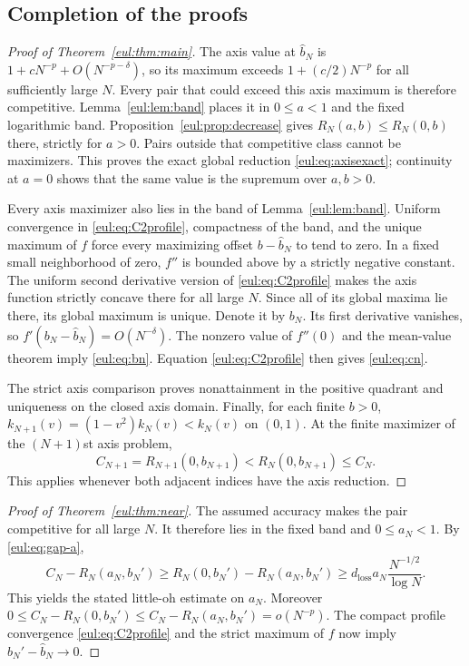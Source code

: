\subsection{Completion of the proofs}
\begin{proof}[Proof of Theorem~\ref{eul:thm:main}]
The axis value at $\widehat b_N$ is
$1+cN^{-p}+O(N^{-p-\delta})$, so its maximum exceeds
$1+(c/2)N^{-p}$ for all sufficiently large $N$.
Every pair that could exceed this axis maximum is therefore competitive.
Lemma~\ref{eul:lem:band} places it in $0\leq a<1$ and the fixed
logarithmic band.  Proposition~\ref{eul:prop:decrease} gives
$R_N(a,b)\leq R_N(0,b)$ there, strictly for $a>0$.
Pairs outside that competitive class cannot be maximizers.  This proves
the exact global reduction \eqref{eul:eq:axisexact}; continuity at $a=0$
shows that the same value is the supremum over $a,b>0$.

Every axis maximizer also lies in the band of Lemma~\ref{eul:lem:band}.
Uniform convergence in \eqref{eul:eq:C2profile}, compactness of the band,
and the unique maximum of $f$ force every maximizing offset
$b-\widehat b_N$ to tend to zero.  In a fixed small neighborhood of
zero, $f''$ is bounded above by a strictly negative constant.  The
uniform second derivative version of \eqref{eul:eq:C2profile} makes the
axis function strictly concave there for all large $N$.
Since all of its global maxima lie there, its global maximum is unique.
Denote it by $b_N$.
Its first derivative vanishes, so
$f'(b_N-\widehat b_N)=O(N^{-\delta})$.
The nonzero value of $f''(0)$ and the mean-value theorem imply
\eqref{eul:eq:bn}.  Equation \eqref{eul:eq:C2profile} then gives
\eqref{eul:eq:cn}.

The strict axis comparison proves nonattainment in the positive quadrant
and uniqueness on the closed axis domain.  Finally, for each finite
$b>0$, $k_{N+1}(v)=(1-v^2)k_N(v)<k_N(v)$ on $(0,1)$.
At the finite maximizer of the $(N+1)$st axis problem,
\[
 C_{N+1}=R_{N+1}(0,b_{N+1})
  <R_N(0,b_{N+1})\leq C_N.
\]
This applies whenever both adjacent indices have the axis reduction.
\end{proof}

\begin{proof}[Proof of Theorem~\ref{eul:thm:near}]
The assumed accuracy makes the pair competitive for all large $N$.
It therefore lies in the fixed band and $0\leq a_N<1$.
By \eqref{eul:eq:gap-a},
\[
 C_N-R_N(a_N,b_N')
 \geq R_N(0,b_N')-R_N(a_N,b_N')
 \geq d_{\mathrm{loss}}a_N\frac{N^{-1/2}}{\log N}.
\]
This yields the stated little-oh estimate on $a_N$.
Moreover
$0\leq C_N-R_N(0,b_N')\leq C_N-R_N(a_N,b_N')=o(N^{-p})$.
The compact profile convergence \eqref{eul:eq:C2profile} and the strict
maximum of $f$ now imply $b_N'-\widehat b_N\to0$.
\end{proof}

